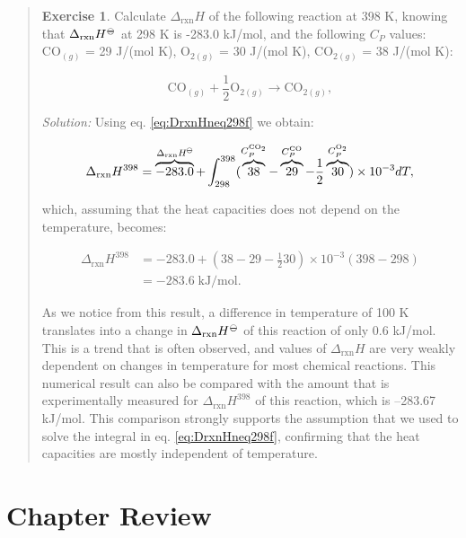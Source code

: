 \documentclass[
  9pt,
]{extbook}
\theoremstyle{definition}
\theoremstyle{definition}
\theoremstyle{definition}
\newtheorem{exercise}{Exercise}[chapter]
\theoremstyle{definition}
\theoremstyle{remark}
\begin{document}
\begin{quote}
\begin{exercise}
\protect\hypertarget{exr:DHtdiff298}{}\label{exr:DHtdiff298}Calculate \(\Delta_{\text{rxn}}H\) of the following reaction at 398 K, knowing that \(\Delta_{\text{rxn}}H^{-\kern-6pt{\ominus}\kern-6pt-}\) at 298 K is -283.0 kJ/mol, and the following \(C_P\) values: \(\mathrm{CO}_{(g)}\) = 29 J/(mol K), \(\mathrm{O}_{2(g)}\) = 30 J/(mol K), \(\mathrm{CO}_{2(g)}\) = 38 J/(mol K):

\[
\mathrm{CO}_{(g)}+\frac{1}{2}\mathrm{O}_{2(g)} \rightarrow \mathrm{CO}_{2(g)},
\]

\emph{Solution:} Using eq. \eqref{eq:DrxnHneq298f} we obtain:

\[
 \Delta_{\text{rxn}} H^{398} = \overbrace{-283.0}^{\Delta_{\text{rxn}}H^{-\kern-6pt{\ominus}\kern-6pt-}} + \int_{298}^{398} ( \overbrace{38}^{C_P^{\mathrm{CO}_2}} -\overbrace{29}^{C_P^{\mathrm{CO}}} -\frac{1}{2}\overbrace{30}^{C_P^{\mathrm{O}_2}} ) \times 10^{-3} dT,
\]

which, assuming that the heat capacities does not depend on the temperature, becomes:

\begin{equation}
\begin{aligned}
 \Delta_{\text{rxn}} H^{398} &= -283.0 + \left(38-29-\frac{1}{2}30 \right) \times 10^{-3} (398-298) \\ &= -283.6 \; \text{kJ/mol}.
\end{aligned}
\end{equation}

As we notice from this result, a difference in temperature of 100 K translates into a change in \(\Delta_{\text{rxn}}H^{-\kern-6pt{\ominus}\kern-6pt-}\) of this reaction of only 0.6 kJ/mol. This is a trend that is often observed, and values of \(\Delta_{\text{rxn}}H\) are very weakly dependent on changes in temperature for most chemical reactions. This numerical result can also be compared with the amount that is experimentally measured for \(\Delta_{\text{rxn}}H^{398}\) of this reaction, which is --283.67 kJ/mol. This comparison strongly supports the assumption that we used to solve the integral in eq. \eqref{eq:DrxnHneq298f}, confirming that the heat capacities are mostly independent of temperature.
\end{exercise}
\end{quote}

\section{Chapter Review}\label{rev4}
\end{document}
